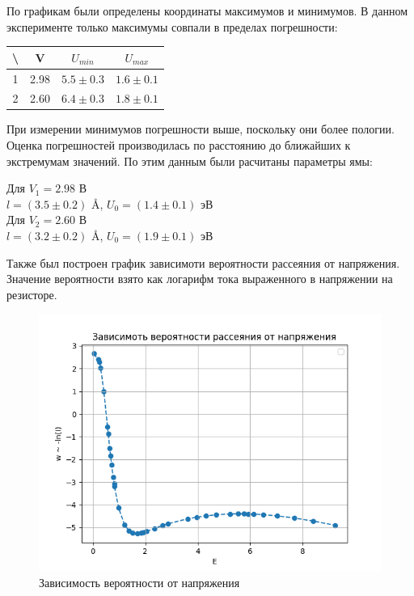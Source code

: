 \documentclass[a4paper,12pt]{article} %
\begin{document}
    По графикам были определены координаты максимумов и минимумов.
    В данном эксперименте только максимумы совпали в пределах погрешности:\par
    \begin{table}[h!]
      \centering
      \begin{tabular}{|c|c|c|c|}
      \hline
      \textbackslash{} & V    & $U_{min}$     & $U_{max}$       \\ \hline
      1                & 2.98 & $5.5 \pm 0.3$ & $1.6 \pm 0.1$ \\ \hline
      2                & 2.60 & $6.4 \pm 0.3$ & $1.8 \pm 0.1$ \\ \hline
      \end{tabular}
    \end{table}
    При измерении минимумов погрешности выше, поскольку они более пологии. 
    Оценка погрешностей производилась по расстоянию до ближайших к экстремумам значений.
  \newpage
    По этим данным были расчитаны параметры ямы:
    \begin{center}
      Для $V_1 = 2.98$ В \\ $l = (3.5 \pm 0.2)$ \AA, $U_0 = (1.4 \pm 0.1)$ эВ \\[0.5 cm]
      Для $V_2 = 2.60$ В \\ $l = (3.2 \pm 0.2)$ \AA, $U_0 = (1.9 \pm 0.1)$ эВ \\[0.5 cm]
    \end{center}  
    Также был построен график зависимоти вероятности рассеяния от напряжения.
    Значение вероятности взято как логарифм тока выраженного в напряжении на резисторе.
    \begin{figure}[h]
      \centering
      \includegraphics[width=1.2\textwidth]{img/Prob.png}
      \caption{Зависимость вероятности от напряжения}
    \end{figure}\par
\end{document}
